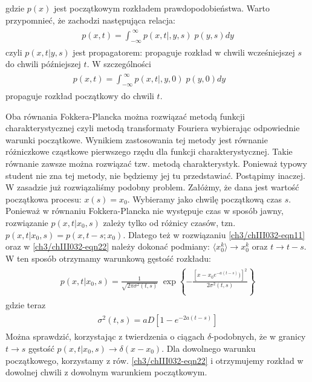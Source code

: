 \documentclass[a4paper,12pt,polish]{sphinxmanual}
\begin{document}
gdzie $p(x)$ jest początkowym rozkładem prawdopodobieństwa. Warto przypomnieć, że zachodzi następująca relacja:
\label{ch3/chIII032:equation-eqn21}\begin{gather}
\begin{split}p(x, t) = \int_{-\infty}^{\; \infty} p(x, t|, y, s) \; p(y, s) dy\end{split}\label{ch3/chIII032-eqn21}
\end{gather}
czyli $p(x, t|y, s)$ jest propagatorem: propaguje rozkład w chwili wcześniejszej $s$ do chwili późniejszej $t$. W szczególności
\label{ch3/chIII032:equation-eqn22}\begin{gather}
\begin{split}p(x, t) = \int_{-\infty}^{\; \infty} p(x, t|, y, 0) \; p(y, 0) dy \qquad\end{split}\label{ch3/chIII032-eqn22}
\end{gather}
propaguje rozkład początkowy do chwili $t$.

Oba równania Fokkera-Plancka można rozwiązać metodą funkcji charakterystycznej czyli metodą transformaty Fouriera wybierając odpowiednie warunki początkowe. Wynikiem zastosowania tej metody jest równanie różniczkowe cząstkowe pierwszego rzędu dla funkcji charakterystycznej. Takie równanie zawsze można rozwiązać tzw. metodą charakterystyk. Ponieważ typowy student nie zna tej metody, nie będziemy jej tu przedstawiać. Postąpimy inaczej. W zasadzie już rozwiązaliśmy podobny problem. Załóżmy, że dana jest wartość początkowa procesu: $x(s) = x_0$. Wybieramy jako chwilę początkową czas $s$. Ponieważ w równaniu Fokkera-Plancka nie występuje czas w sposób jawny, rozwiązanie $p(x, t|x_0, s)$ zależy tylko od różnicy czasów, tzn. $p(x, t|x_0, s) = p(x, t-s; x_0)$. Dlatego też w rozwiązaniu \eqref{ch3/chIII032-eqn11} oraz w \eqref{ch3/chIII032-eqn22} należy dokonać podmiany: $\langle x_0^k\rangle \to x_0^k$ oraz $t \to t-s$. W ten sposób otrzymamy warunkową gęstość rozkładu:
\label{ch3/chIII032:equation-eqn23}\begin{gather}
\begin{split}p(x, t|x_0, s) = \frac{1}{\sqrt{2\pi \sigma^2(t, s)} }\; \exp\left\{ - \frac{[x- x_0 e^{-a(t-s)})]^2}{2\sigma^2(t, s)}\right\}\end{split}\label{ch3/chIII032-eqn23}
\end{gather}
gdzie teraz
\label{ch3/chIII032:equation-eqn24}\begin{gather}
\begin{split} \sigma^2(t, s) = aD [1 - e^{-2a(t-s)}]\end{split}\label{ch3/chIII032-eqn24}
\end{gather}
Można sprawdzić, korzystając z twierdzenia o ciągach $\delta$-podobnych, że w
granicy $t\to s$ gęstość $p(x, t|x_0, s) \to \delta(x-x_0)$. Dla dowolnego
warunku początkowego, korzystamy z rów. \eqref{ch3/chIII032-eqn22} i otrzymujemy rozkład w dowolnej chwili z dowolnym warunkiem początkowym.
\end{document}
